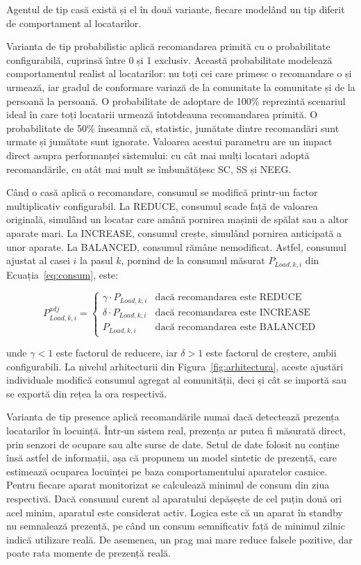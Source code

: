 \documentclass[12pt,a4paper]{report}
\begin{document}
Agentul de tip casă există și el în două variante, fiecare modelând un tip diferit de comportament al locatarilor.

Varianta de tip probabilistic aplică recomandarea primită cu o probabilitate configurabilă, cuprinsă între 0 și 1 exclusiv. Această probabilitate modelează comportamentul realist al locatarilor: nu toți cei care primesc o recomandare o și urmează, iar gradul de conformare variază de la comunitate la comunitate și de la persoană la persoană. O probabilitate de adoptare de 100\% reprezintă scenariul ideal în care toți locatarii urmează întotdeauna recomandarea primită. O probabilitate de 50\% înseamnă că, statistic, jumătate dintre recomandări sunt urmate și jumătate sunt ignorate. Valoarea acestui parametru are un impact direct asupra performanței sistemului: cu cât mai mulți locatari adoptă recomandările, cu atât mai mult se îmbunătățesc SC, SS și NEEG.

Când o casă aplică o recomandare, consumul se modifică printr-un factor multiplicativ configurabil. La REDUCE, consumul scade față de valoarea originală, simulând un locatar care amână pornirea mașinii de spălat sau a altor aparate mari. La INCREASE, consumul crește, simulând pornirea anticipată a unor aparate. La BALANCED, consumul rămâne nemodificat. Astfel, consumul ajustat al casei $i$ la pasul $k$, pornind de la consumul măsurat $P_{Load,k,i}$ din Ecuația~\ref{eq:consum}, este:

\begin{equation}
  P_{Load,k,i}^{adj} = \begin{cases}
    \gamma \cdot P_{Load,k,i} & \text{dacă recomandarea este REDUCE}   \\
    \delta \cdot P_{Load,k,i} & \text{dacă recomandarea este INCREASE} \\
    P_{Load,k,i}              & \text{dacă recomandarea este BALANCED}
  \end{cases}
  \label{eq:ajustare}
\end{equation}

unde $\gamma < 1$ este factorul de reducere, iar $\delta > 1$ este factorul de creștere, ambii configurabili. La nivelul arhitecturii din Figura~\ref{fig:arhitectura}, aceste ajustări individuale modifică consumul agregat al comunității, deci și cât se importă sau se exportă din rețea la ora respectivă.

Varianta de tip presence aplică recomandările numai dacă detectează prezența locatarilor în locuință. Într-un sistem real, prezența ar putea fi măsurată direct, prin senzori de ocupare sau alte surse de date. Setul de date folosit nu conține însă astfel de informații, așa că propunem un model sintetic de prezență, care estimează ocuparea locuinței pe baza comportamentului aparatelor casnice. Pentru fiecare aparat monitorizat se calculează minimul de consum din ziua respectivă. Dacă consumul curent al aparatului depășește de cel puțin două ori acel minim, aparatul este considerat activ. Logica este că un aparat în standby nu semnalează prezență, pe când un consum semnificativ față de minimul zilnic indică utilizare reală. De asemenea, un prag mai mare reduce falsele pozitive, dar poate rata momente de prezență reală.
\end{document}
